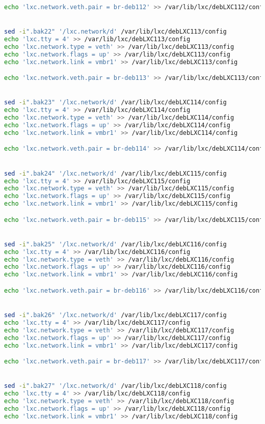 \documentclass[french]{article}
\begin{document}
\begin{lstlisting}[language=bash,caption={}]
echo 'lxc.network.veth.pair = br-deb112' >> /var/lib/lxc/debLXC112/config


sed -i".bak22" '/lxc.network/d' /var/lib/lxc/debLXC113/config
echo 'lxc.tty = 4' >> /var/lib/lxc/debLXC113/config
echo 'lxc.network.type = veth' >> /var/lib/lxc/debLXC113/config
echo 'lxc.network.flags = up' >> /var/lib/lxc/debLXC113/config
echo 'lxc.network.link = vmbr1' >> /var/lib/lxc/debLXC113/config

echo 'lxc.network.veth.pair = br-deb113' >> /var/lib/lxc/debLXC113/config


sed -i".bak23" '/lxc.network/d' /var/lib/lxc/debLXC114/config
echo 'lxc.tty = 4' >> /var/lib/lxc/debLXC114/config
echo 'lxc.network.type = veth' >> /var/lib/lxc/debLXC114/config
echo 'lxc.network.flags = up' >> /var/lib/lxc/debLXC114/config
echo 'lxc.network.link = vmbr1' >> /var/lib/lxc/debLXC114/config

echo 'lxc.network.veth.pair = br-deb114' >> /var/lib/lxc/debLXC114/config


sed -i".bak24" '/lxc.network/d' /var/lib/lxc/debLXC115/config
echo 'lxc.tty = 4' >> /var/lib/lxc/debLXC115/config
echo 'lxc.network.type = veth' >> /var/lib/lxc/debLXC115/config
echo 'lxc.network.flags = up' >> /var/lib/lxc/debLXC115/config
echo 'lxc.network.link = vmbr1' >> /var/lib/lxc/debLXC115/config

echo 'lxc.network.veth.pair = br-deb115' >> /var/lib/lxc/debLXC115/config


sed -i".bak25" '/lxc.network/d' /var/lib/lxc/debLXC116/config
echo 'lxc.tty = 4' >> /var/lib/lxc/debLXC116/config
echo 'lxc.network.type = veth' >> /var/lib/lxc/debLXC116/config
echo 'lxc.network.flags = up' >> /var/lib/lxc/debLXC116/config
echo 'lxc.network.link = vmbr1' >> /var/lib/lxc/debLXC116/config

echo 'lxc.network.veth.pair = br-deb116' >> /var/lib/lxc/debLXC116/config


sed -i".bak26" '/lxc.network/d' /var/lib/lxc/debLXC117/config
echo 'lxc.tty = 4' >> /var/lib/lxc/debLXC117/config
echo 'lxc.network.type = veth' >> /var/lib/lxc/debLXC117/config
echo 'lxc.network.flags = up' >> /var/lib/lxc/debLXC117/config
echo 'lxc.network.link = vmbr1' >> /var/lib/lxc/debLXC117/config

echo 'lxc.network.veth.pair = br-deb117' >> /var/lib/lxc/debLXC117/config


sed -i".bak27" '/lxc.network/d' /var/lib/lxc/debLXC118/config
echo 'lxc.tty = 4' >> /var/lib/lxc/debLXC118/config
echo 'lxc.network.type = veth' >> /var/lib/lxc/debLXC118/config
echo 'lxc.network.flags = up' >> /var/lib/lxc/debLXC118/config
echo 'lxc.network.link = vmbr1' >> /var/lib/lxc/debLXC118/config


\end{lstlisting}
\end{document}
